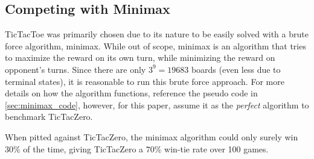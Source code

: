 
\subsection{Competing with Minimax}
TicTacToe was primarily chosen due to its nature to be easily solved with a brute force algorithm, minimax. While out of scope, minimax is an algorithm that tries to maximize the reward on its own turn, while minimizing the reward on opponent's turns. Since there are only $3^9 = 19683$ boards (even less due to terminal states), it is reasonable to run this brute force approach. For more details on how the algorithm functions, reference the pseudo code in \cref{sec:minimax_code}, however, for this paper, assume it as the \emph{perfect} algorithm to benchmark TicTacZero.

When pitted against TicTacZero, the minimax algorithm could only surely win $30\%$ of the time, giving TicTacZero a $70\%$ win-tie rate over 100 games.